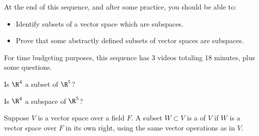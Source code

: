







At the end of this sequence, and after some practice, you should be able to:

\begin{itemize}
\item Identify subsets of a vector space which are subspaces.
\item Prove that some abstractly defined subsets of vector spaces are subspaces.

\end{itemize}


For time budgeting purposes, this sequence has 3 videos totaling 18 minutes, 
plus some questions.  




\endedxtext

\endedxvertical








Is $\R^4$ a subset of $\R^5$?  



Is $\R^4$ a subspace of $\R^5$?  




\endedxproblem

\endedxvertical






{}  
Suppose $V$ is a vector space over a field $F$.  A subset $W \subset V$ is a {}  
of $V$ if $W$ is a vector space over $F$ in its own right, using the same vector operations as in $V$.  

